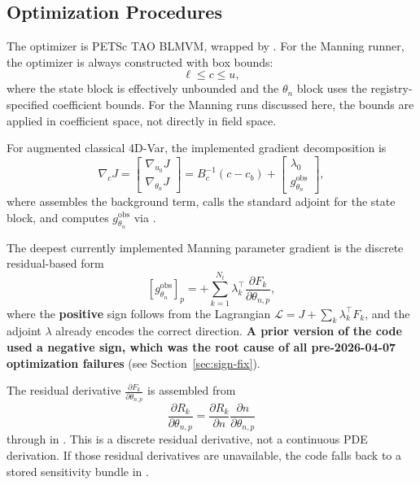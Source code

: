 \documentclass[11pt]{article}
\begin{document}
\subsection{Optimization Procedures}
The optimizer is PETSc TAO BLMVM, wrapped by . For the Manning runner, the optimizer is always constructed with box bounds:
\[
\ell \le c \le u,
\]
where the state block is effectively unbounded and the $\theta_n$ block uses the registry-specified coefficient bounds. For the Manning runs discussed here, the bounds are applied in coefficient space, not directly in field space.

For augmented classical 4D-Var, the implemented gradient decomposition is
\[
\nabla_c J
=
\begin{bmatrix}
\nabla_{u_0} J \\
\nabla_{\theta_n} J
\end{bmatrix}
=
B_c^{-1}(c-c_b)
+\begin{bmatrix}
\lambda_0 \\
g_{\theta_n}^{\mathrm{obs}}
\end{bmatrix},
\]
where  assembles the background term, calls the standard adjoint for the state block, and computes $g_{\theta_n}^{\mathrm{obs}}$ via .

The deepest currently implemented Manning parameter gradient is the discrete residual-based form
\[
\left[g_{\theta_n}^{\mathrm{obs}}\right]_p
= + \sum_{k=1}^{N_t} \lambda_k^\top \frac{\partial F_k}{\partial \theta_{n,p}},
\]
where the \textbf{positive} sign follows from the Lagrangian $\mathcal{L} = J + \sum_k \lambda_k^\top F_k$, and the adjoint $\lambda$ already encodes the correct direction. \textbf{A prior version of the code used a negative sign, which was the root cause of all pre-2026-04-07 optimization failures} (see Section~\ref{sec:sign-fix}).

The residual derivative \(\frac{\partial F_k}{\partial \theta_{n,p}}\) is assembled from
\[
\frac{\partial R_k}{\partial \theta_{n,p}}
=
\frac{\partial R_k}{\partial n}\frac{\partial n}{\partial \theta_{n,p}}
\]
through  in . This is a discrete residual derivative, not a continuous PDE derivation. If those residual derivatives are unavailable, the code falls back to a stored sensitivity bundle in .
\end{document}
